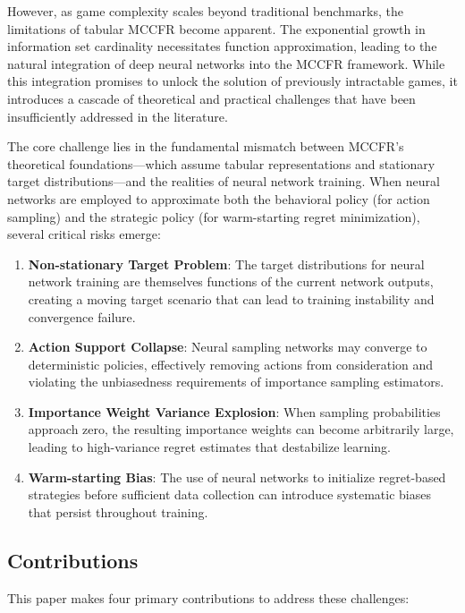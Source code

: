 \documentclass[12pt,a4paper]{article}
\begin{document}
However, as game complexity scales beyond traditional benchmarks, the limitations of tabular MCCFR become apparent. The exponential growth in information set cardinality necessitates function approximation, leading to the natural integration of deep neural networks into the MCCFR framework. While this integration promises to unlock the solution of previously intractable games, it introduces a cascade of theoretical and practical challenges that have been insufficiently addressed in the literature.

The core challenge lies in the fundamental mismatch between MCCFR's theoretical foundations—which assume tabular representations and stationary target distributions—and the realities of neural network training. When neural networks are employed to approximate both the behavioral policy (for action sampling) and the strategic policy (for warm-starting regret minimization), several critical risks emerge:

\begin{enumerate}
\item \textbf{Non-stationary Target Problem}: The target distributions for neural network training are themselves functions of the current network outputs, creating a moving target scenario that can lead to training instability and convergence failure.

\item \textbf{Action Support Collapse}: Neural sampling networks may converge to deterministic policies, effectively removing actions from consideration and violating the unbiasedness requirements of importance sampling estimators.

\item \textbf{Importance Weight Variance Explosion}: When sampling probabilities approach zero, the resulting importance weights can become arbitrarily large, leading to high-variance regret estimates that destabilize learning.

\item \textbf{Warm-starting Bias}: The use of neural networks to initialize regret-based strategies before sufficient data collection can introduce systematic biases that persist throughout training.
\end{enumerate}

\subsection{Contributions}

This paper makes four primary contributions to address these challenges:
\end{document}
